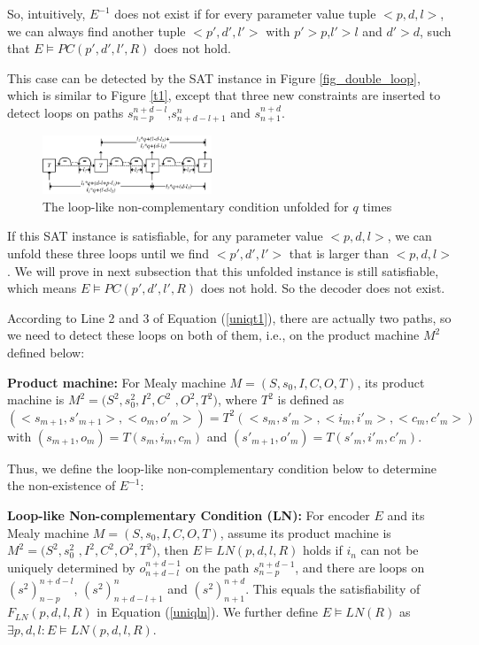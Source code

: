 \documentclass{sig-alternate}
\begin{document}
So,
intuitively,
$E^{-1}$ does not exist if for every parameter value tuple $<p,d,l>$,
we can always find another tuple $<p',d',l'>$ with $p'>p$,$l'>l$ and $d'>d$,
such that $E\vDash PC(p',d',l',R)$ does not hold.

This case can be detected by the SAT instance in Figure \ref{fig_double_loop},
which is similar to Figure \ref{t1},
except that three new constraints are inserted to detect loops on paths $s_{n-p}^{n+d-l}$,$s_{n+d-l+1}^n$ and $s_{n+1}^{n+d}$.


\begin{figure}[t]
\begin{center}
\includegraphics[width=0.45\textwidth]{doubleloop_unfold}
\end{center}
\caption{The loop-like non-complementary condition unfolded for $q$ times}
  \label{fig_double_loop_unfold}
\end{figure}

If this SAT instance is satisfiable,
for any parameter value $<p,d,l>$,
we can unfold these three loops until we find $<p',d',l'>$ that is larger than $<p,d,l>$.
We will prove in next subsection that this unfolded instance is still satisfiable,
which means $E\vDash PC(p',d',l',R)$ does not hold.
So the decoder does not exist.

According to Line 2 and 3 of Equation (\ref{uniqt1}),
there are actually two paths,
so we need to detect these loops on both of them,
i.e.,
on the product machine $M^2$ defined below:

\begin{definition11}%
\textbf{Product machine:} For Mealy machine $M=(S,s_0,I,C,O,T)$,
its product machine is $M^2=(S^2,s_0^2,I^2,C^2$ $,O^2,T^2)$,
where
$T^2$ is defined as $(<s_{m+1},s'_{m+1}>,<o_m,o'_m>)=T^2(<s_m,s'_m>,<i_m,i'_m>,<c_m,c'_m>)$ with $(s_{m+1},o_m)=T(s_m,i_m,c_m)$ and $(s'_{m+1},o'_m)=T(s'_m,i'_m,c'_m)$.
\end{definition11}

Thus,
we define the loop-like non-complementary condition below to determine the non-existence of $E^{-1}$:

\begin{definition11}\label{def_lnc}%
\textbf{Loop-like Non-complementary Condition (LN):} For encoder $E$ and its Mealy machine $M=(S,s_0,I,C,O,T)$,
assume its product machine is $M^2=(S^2,s_0^2$ $,I^2,C^2,O^2,T^2)$,
then $E\vDash LN(p,d,l,R)$ holds if
$i_n$ can not be uniquely determined by $o_{n+d-l}^{n+d-1}$ on the path $s_{n-p}^{n+d-1}$,
and there are loops on $(s^2)_{n-p}^{n+d-l}$, $(s^2)_{n+d-l+1}^n$ and $(s^2)_{n+1}^{n+d}$.
This equals the satisfiability of $F_{LN}(p,d,l,R)$ in Equation (\ref{uniqln}).
We further define $E\vDash LN(R)$ as $\exists p,d,l:E\vDash LN(p,d,l,R)$.
\end{definition11}
\end{document}
